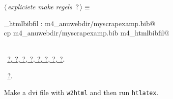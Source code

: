 \documentclass[twoside]{artikel3}
\renewcommand{\NWlink}[2]{\hyperlink{#1}{#2}}
\renewcommand{\NWtarget}[2]{\hypertarget{#1}{#2}}
\renewcommand{\NWsep}{$\diamond$\rule[-1\baselineskip]{0pt}{1\baselineskip}}
\renewcommand{\NWlink}[2]{\hyperlink{#1}{#2}}
\renewcommand{\NWtarget}[2]{\hypertarget{#1}{#2}}
\begin{document}
\begin{flushleft} \small
\begin{minipage}{\linewidth}\label{scrap33}\raggedright\small
\NWtarget{nuweb?}{} $\langle\,${\itshape expliciete make regels}\nobreak\ {\footnotesize {?}}$\,\rangle\equiv$
\vspace{-1ex}
\begin{list}{}{} \item
\mbox{}_htmlbibfil : m4_anuwebdir/myscrapexamp.bib@\\
\mbox{}\verb@        cp m4_anuwebdir/myscrapexamp.bib m4_htmlbibfil@\\
\mbox{}\verb@@\\
\mbox{}\verb@@{\NWsep}
\end{list}
\vspace{-1.5ex}
\footnotesize
\begin{list}{}{\setlength{\itemsep}{-\parsep}\setlength{\itemindent}{-\leftmargin}}
\item \NWtxtMacroDefBy\ \NWlink{nuweb?}{?}\NWlink{nuweb?}{, ?}\NWlink{nuweb?}{, ?}\NWlink{nuweb?}{, ?}\NWlink{nuweb?}{, ?}\NWlink{nuweb?}{, ?}\NWlink{nuweb?}{, ?}\NWlink{nuweb?}{, ?}.
\item \NWtxtMacroRefIn\ \NWlink{nuweb?}{?}.

\item{}
\end{list}
\end{minipage}\vspace{4ex}
\end{flushleft}
Make a dvi file with \texttt{w2html} and then run
\texttt{htlatex}. 
\end{document}
